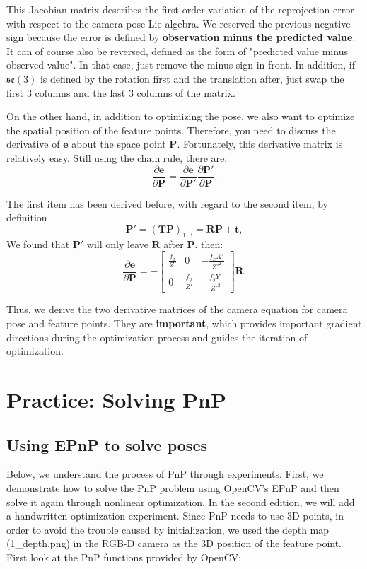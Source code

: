 This Jacobian matrix describes the first-order variation of the reprojection error with respect to the camera pose Lie algebra. We reserved the previous negative sign because the error is defined by \textbf{observation minus the predicted value}. It can of course also be reversed, defined as the form of "predicted value minus observed value". In that case, just remove the minus sign in front. In addition, if $\mathfrak{se}(3)$ is defined by the rotation first and the translation after, just swap the first 3 columns and the last 3 columns of the matrix.

On the other hand, in addition to optimizing the pose, we also want to optimize the spatial position of the feature points. Therefore, you need to discuss the derivative of $\bm{e}$ about the space point $\bm{P}$. Fortunately, this derivative matrix is ​​relatively easy. Still using the chain rule, there are:
\begin{equation}
\frac{{\partial \bm{e}}}{{\partial \bm{P} }} = \frac{{\partial \bm{e}}}{{\partial \bm{P}'}} \frac{{\partial \bm{P}'}}{{\partial \bm{P} }}.
\end{equation}

The first item has been derived before, with regard to the second item, by definition
\[
\bm{P}'= (\bm{T} \bm{P})_{1:3} = \bm{R} \bm{P} + \bm{t},
\]
We found that $\bm{P}'$ will only leave $\bm{R}$ after $\bm{P}$. then:
\begin{equation}
\label{eq:jacob-uv2P}
\frac{{\partial \bm{e}}}{{\partial \bm{P} }} = -\left[
\begin{array}{*{20}{c}}
\frac{f_x}{Z'} & 0 &- \frac{f_x X'}{Z'^2} \\
0 & \frac{f_y}{Z'} & - \frac{f_y Y'}{Z'^2}
\end{array} \right] \bm{R}.
\end{equation}

Thus, we derive the two derivative matrices of the camera equation for camera pose and feature points. They are \textbf{important}, which provides important gradient directions during the optimization process and guides the iteration of optimization.

\section{Practice: Solving PnP}
\subsection{Using EPnP to solve poses}
Below, we understand the process of PnP through experiments. First, we demonstrate how to solve the PnP problem using OpenCV's EPnP and then solve it again through nonlinear optimization. In the second edition, we will add a handwritten optimization experiment. Since PnP needs to use 3D points, in order to avoid the trouble caused by initialization, we used the depth map (1_depth.png) in the RGB-D camera as the 3D position of the feature point. First look at the PnP functions provided by OpenCV:

